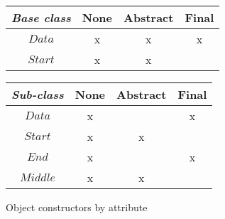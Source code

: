\begin{figure}
    \begin{center}
        \begin{tabular}{|c|c|c|c|}
            \hline \emph{Base class} & None & Abstract & Final \\ 
            \hline $\mathit{Data}$         & x & x & x \\ 
            \hline $\mathit{Start}$     & x & x & \\
            \hline
        \end{tabular} 
        \begin{tabular}{|c|c|c|c|}
            \hline \emph{Sub-class} & None & Abstract & Final \\ 
            \hline $\mathit{Data}$         & x &   & x \\ 
            \hline $\mathit{Start}$     & x & x &   \\ 
            \hline $\mathit{End}$     & x &   & x \\ 
            \hline $\mathit{Middle}$ & x & x &   \\ 
            \hline 
        \end{tabular} 
    \end{center}
    \caption{Object constructors by attribute}
    \label{tab:baseconstructors}
\end{figure}

